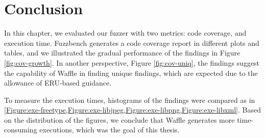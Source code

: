 \clearpage
\section{Conclusion}
\label{sec:ch5-conclusion}


In this chapter, we evaluated our fuzzer with two metrics: code coverage, and execution time. Fuzzbench generates a code coverage report in different plots and tables, and we illustrated the gradual performance of the findings in Figure \ref{fig:cov-growth}. In another perspective, Figure \ref{fig:cov-uniq}, the findings suggest the capability of Waffle in finding unique findings, which are expected due to the allowance of ERU-based guidance.

To measure the execution times, histograms of the findings were compared as in \cref{Figure:exe-freetype,Figure:exe-libjpeg,Figure:exe-libpng,Figure:exe-libxml}. Based on the distribution of the figures, we conclude that Waffle generates more time-consuming executions, which was the goal of this thesis.